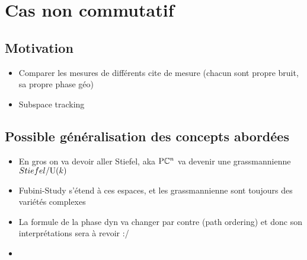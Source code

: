 \section{Cas non commutatif}

\subsection{Motivation}

\begin{itemize}
	
	\item Comparer les mesures de différents cite de mesure (chacun sont propre bruit, sa propre phase géo)
	
	\item Subspace tracking
	
\end{itemize}



\subsection{Possible généralisation des concepts abordées}

\begin{itemize}
	
	\item En gros on va devoir aller Stiefel, aka $\text{\normalfont P}\mathbb{C}^{n}$ va devenir une grassmannienne $Stiefel/\text{\normalfont U}(k)$
	
	\item Fubini-Study s'étend à ces espaces, et les grassmannienne sont toujours des variétés complexes
	
	\item La formule de la phase dyn va changer par contre (path ordering) et donc son interprétations sera à revoir :/
	
	\item
	
\end{itemize}